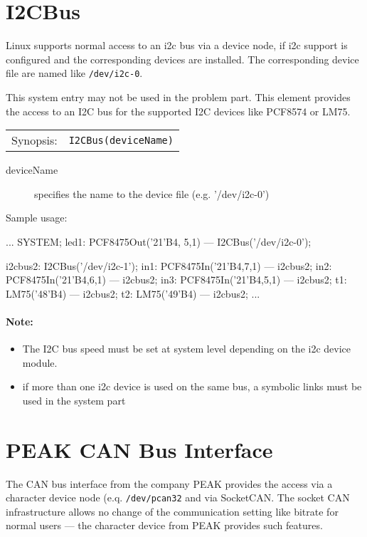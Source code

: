 \section{I2CBus}
Linux supports normal access to an i2c bus via a device node,
 if i2c support is configured and the corresponding devices are installed.
The corresponding device file are named like \texttt{/dev/i2c-0}.

This system entry may not be used in the problem part. This element
provides the access to an I2C bus for the supported I2C devices like 
PCF8574 or LM75.

\begin{tabular}{ll}
Synopsis: & \verb|I2CBus(deviceName)|\\ 
\end{tabular}

\begin{description}
\item[deviceName] specifies the name to the device file (e.g. '/dev/i2c-0')
\end{description}

Sample usage:
\begin{PEARLCode}
...
SYSTEM;
   led1: PCF8475Out('21'B4, 5,1) --- I2CBus('/dev/i2c-0');

   i2cbus2: I2CBus('/dev/i2c-1');
   in1: PCF8475In('21'B4,7,1) --- i2cbus2;
   in2: PCF8475In('21'B4,6,1) --- i2cbus2;
   in3: PCF8475In('21'B4,5,1) --- i2cbus2;
   t1: LM75('48'B4) --- i2cbus2;
   t2: LM75('49'B4) --- i2cbus2;
...
\end{PEARLCode}

\paragraph{Note:}
\begin{itemize}
\item The I2C bus speed must be set at system level depending on the 
i2c device module.
\item if more than one i2c device is used on the same bus, a symbolic
   links must be used in the system part
\end{itemize}

\section{PEAK CAN Bus Interface}
The CAN bus interface from the company PEAK provides the access via a character 
device node (e.q. \texttt{/dev/pcan32} and via SocketCAN.
The socket CAN infrastructure allows no change of the communication setting
like bitrate for normal users --- the character device from PEAK provides
such features. 

